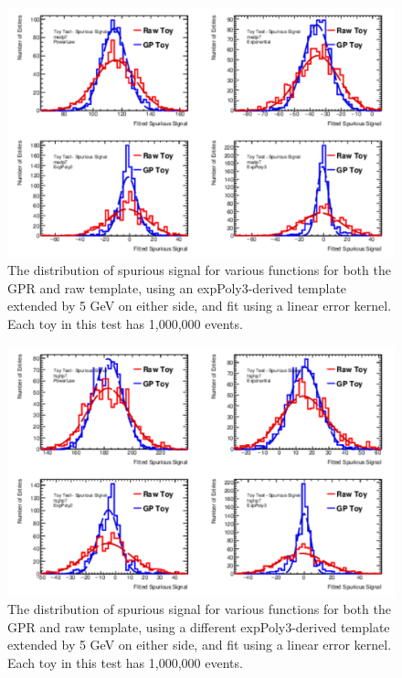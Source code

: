 \begin{figure} 
\begin{center}
  \includegraphics[width=\textwidth]{figures/background/gpr/validation/linear/ToyTest_FitSigVals_medpT_1M_noSig}   
\caption{The distribution of spurious signal for various functions for both the GPR and raw template, using an expPoly3-derived template extended by 5 GeV on either side, and fit using a linear error kernel. Each toy in this test has 1,000,000 events.}
\label{fig:linearkernel_medpt_1M_noSig}
\end{center}
\end{figure}

\begin{figure} 
\begin{center}
  \includegraphics[width=\textwidth]{figures/background/gpr/validation/linear/ToyTest_FitSigVals_highpT_1M_noSig}   
\caption{The distribution of spurious signal for various functions for both the GPR and raw template, using a different expPoly3-derived template extended by 5 GeV on either side, and fit using a linear error kernel. Each toy in this test has 1,000,000 events.}
\label{fig:linearkernel_highpt_1M_noSig}
\end{center}
\end{figure}

